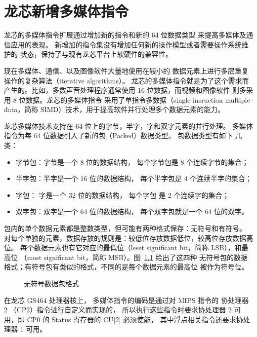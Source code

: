 \chapter{龙芯新增多媒体指令}\label{chp:simd}

龙芯的多媒体指令扩展通过增加新的指令和新的 64 位数据类型
来提高多媒体及通信应用的表现。
新增加的指令集没有增加任何新的操作模型或者需要操作系统维护的
状态，保持了与现有龙芯平台上软硬件的兼容性。

现在多媒体、通信、以及图像软件大量地使用在较小的
数据元素上进行多层重复操作的复杂算法（iterative algorithms）。
龙芯的多媒体指令就是为了这个需求而产生的。比如，多数声音处理程序通常使用 16
位数据，而视频和图像软件 则多采用 8 位数据。龙芯的多媒体指令
采用了单指令多数据（single insruction multiple data，简称
SIMD）技术，用于提高软件并行处理多个数据元素的能力。

龙芯多媒体技术支持在 64 位上的字节，半字，字和双字元素的并行处理。
多媒体指令为每 64 位数据引入了新的包（Packed）数据类型。 包数据类型有如下
几类：
\begin{itemize}
  \item 字节包：字节是一个  8 位的数据结构， 每个字节包是 8 个连续字节的集合；
  \item 半字包：半字是一个 16 位的数据结构， 每个半字包是 4 个连续半字的集合；
  \item   字包：  字是一个 32 位的数据结构， 每个字包  是 2 个连续字的集合；
  \item 双字包：双字是一个 64 位的数据结构， 每个双字包就是一个 64 位的双字。
\end{itemize}
包内的单个数据元素都是整数类型，但可能有两种格式保存：无符号和有符号。
对每个单独的元素，数据存放的规则是：较低位存放数据低位，较高位存放数据高位。
每个数据元素也有它对应的最低位（leset significant bit，简称 LSB），和最高位
（most significant bit，简称 MSB）。图~\ref{fig:packed-data} 给出了这四种
无符号包的数据格式；有符号包有类似的格式，不同的是每个数据元素的最高位
被作为符号位。

\begin{figure}[htbp]
  \centering
  \setlength\fboxsep{10pt}
  \setlength\fboxrule{.5pt}
  \fbox{\scalebox{.78}{\usebox{\packeddata}}}
  \caption{无符号数据包格式}
  \label{fig:packed-data}
\end{figure}

在龙芯 GS464 处理器核上， 多媒体指令的编码是通过对 MIPS 指令的 协处理器 2
（CP2）指令进行自定义而实现的， 所以执行这些指令时要求协处理器 2 可用，即 CP0
的 Status 寄存器的 CU[2] 必须使能， 其中浮点相关指令还要求协处理器 1 可用。

